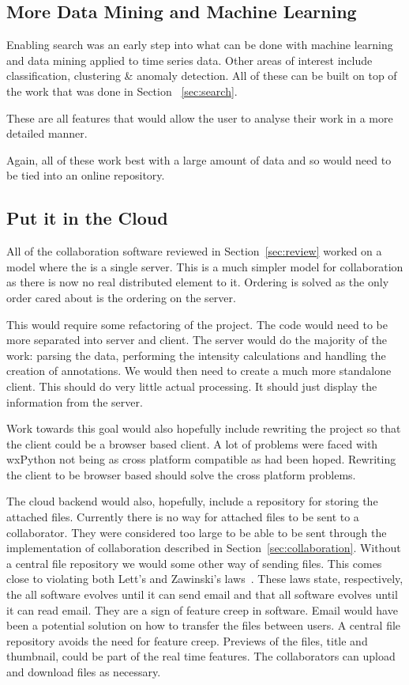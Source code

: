 \subsection{More Data Mining and Machine Learning}

Enabling search was an early step into what can be done with machine learning and data mining applied to time series data.  Other areas of interest include classification, clustering \& anomaly detection.  All of these can be built on top of the work that was done in Section ~\ref{sec:search}.

These are all features that would allow the user to analyse their work in a more detailed manner.

Again, all of these work best with a large amount of data and so would need to be tied into an online repository.

\subsection{Put it in the Cloud}
\label{sec:cloud}
All of the collaboration software reviewed in Section~\ref{sec:review} worked on a model where the is a single server.  This is a much simpler model for collaboration as there is now no real distributed element to it.  Ordering is solved as the only order cared about is the ordering on the server.

This would require some refactoring of the project.  The code would need to be more separated into server and client.  The server would do the majority of the work: parsing the data, performing the intensity calculations and handling the creation of annotations.  We would then need to create a much more standalone client.  This should do very little actual processing.  It should just display the information from the server.

Work towards this goal would also hopefully include rewriting the project so that the client could be a browser based client.  A lot of problems were faced with wxPython not being as cross platform compatible as had been hoped.  Rewriting the client to be browser based should solve the cross platform problems.

The cloud backend would also, hopefully, include a repository for storing the attached files.  Currently there is no way for attached files to be sent to a collaborator.  They were considered too large to be able to be sent through the implementation of collaboration described in Section~\ref{sec:collaboration}.  Without a central file repository we would some other way of sending files.  This comes close to violating both Lett's and Zawinski's laws~\cite{atwoord}.  These laws state, respectively, the all software evolves until it can send email and that all software evolves until it can read email.  They are a sign of feature creep in software.  Email would have been a potential solution on how to transfer the files between users.  A central file repository avoids the need for feature creep.  Previews of the files, title and thumbnail, could be part of the real time features.  The collaborators can upload and download files as necessary.

